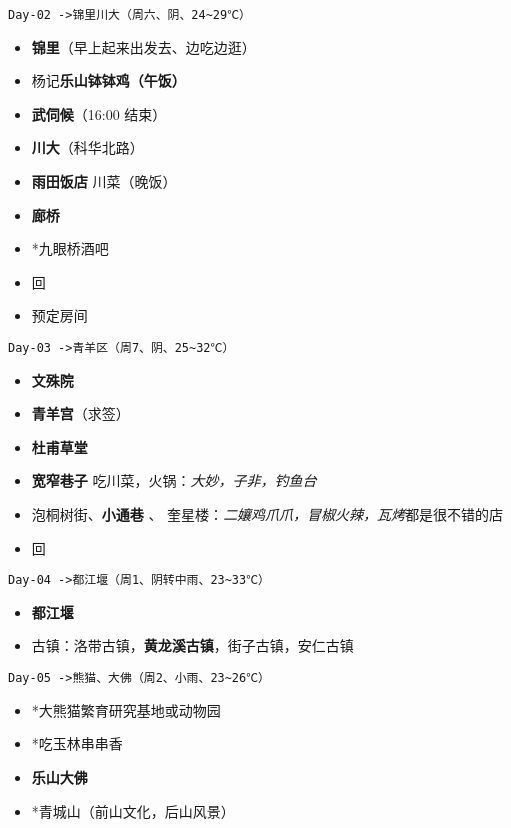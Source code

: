 \documentclass[UTF8,a4paper,8pt]{ctexart}
\begin{document}
		 	 \verb|Day-02 ->锦里川大（周六、阴、24~29℃）|
		 	 \begin{itemize}[itemindent = 2em]
		 	 	\item \textbf{锦里}（早上起来出发去、边吃边逛）
		 	 	\item 杨记\textbf{乐山钵钵鸡（午饭）} 
		 	 	\item \textbf{武伺候}（16:00 结束）
		 	 	\item \textbf{川大}（科华北路）
		 	 	\item \textbf{雨田饭店} 川菜（晚饭）
		 	 	\item \textbf{廊桥}
		 	 	\item *九眼桥酒吧
		 	 	\item 回
		 	 	\item 预定房间
		 	 \end{itemize}
		 	 
		 	 \verb|Day-03 ->青羊区（周7、阴、25~32℃）|
		 	 \begin{itemize}[itemindent = 2em]
		 	 	\item \textbf{文殊院}
		 	 	\item \textbf{青羊宫}（求签）
		 	 	\item \textbf{杜甫草堂}		 	 	
		 	 	\item \textbf{宽窄巷子} 吃川菜，火锅：\textit{大妙，子非，钓鱼台}
		 	 	\item 泡桐树街、\textbf{小通巷}	、 奎星楼：\textit{二孃鸡爪爪，冒椒火辣，瓦烤}都是很不错的店
		 	 	\item 回	 	
		 	 \end{itemize}
		 	 
		 	 \verb|Day-04 ->都江堰（周1、阴转中雨、23~33℃）|
		 	 \begin{itemize}[itemindent = 2em]
		 	 	\item \textbf{都江堰}	 
		 	 	\item 古镇：洛带古镇，\textbf{黄龙溪古镇}，街子古镇，安仁古镇	 	
		 	 \end{itemize}
		 	 
		 	 \verb|Day-05 ->熊猫、大佛（周2、小雨、23~26℃）|
		 	 \begin{itemize}[itemindent = 2em]
		 	 	\item *大熊猫繁育研究基地或动物园
		 	 	\item *吃玉林串串香
		 	 	\item \textbf{乐山大佛 }	
		 	 	\item *青城山（前山文化，后山风景）	
		 	 \end{itemize}
		 	 
\end{document}
